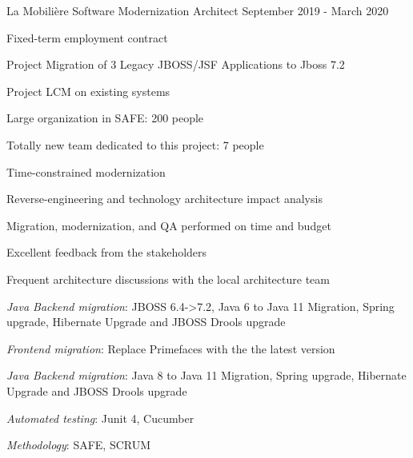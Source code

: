 \begin{cventries}
        \cventry
        {} %
        {} %
        {} %
        {} %
        {
            \globalexperience
            {La Mobilière} %
            {Software Modernization Architect} %
            {September 2019 - March 2020} %
            {
                \begin{cvitems} %
                    \item{Fixed-term employment contract}
                    \item{Project Migration of 3 Legacy JBOSS/JSF Applications to Jboss 7.2}
                    \item{Project LCM on existing systems}
                    \item{Large organization in SAFE: 200 people}
                    \item{Totally new team dedicated to this project: 7 people}
                    \item{Time-constrained modernization}
                    \item{Reverse-engineering and technology architecture impact analysis}
                \end{cvitems}
            }
            {
                \begin{cvitems} %
                    \item{Migration, modernization, and QA performed on time and budget}
                    \item{Excellent feedback from the stakeholders}
                    \item{Frequent architecture discussions with the local architecture team}
                \end{cvitems}
            }
            {
                \begin{cvitems} %
                    \item{\emph{Java Backend migration}: JBOSS 6.4->7.2, Java 6 to Java 11 Migration, Spring upgrade, Hibernate Upgrade and JBOSS Drools upgrade}
                    \item{\emph{Frontend migration}: Replace Primefaces with the the latest version}
                    \item{\emph{Java Backend migration}: Java 8 to Java 11 Migration, Spring upgrade, Hibernate Upgrade and JBOSS Drools upgrade}
                    \item{\emph{Automated testing}: Junit 4, Cucumber}
                    \item{\emph{Methodology}: SAFE, SCRUM}
                \end{cvitems}
            }
        }


\end{cventries}
